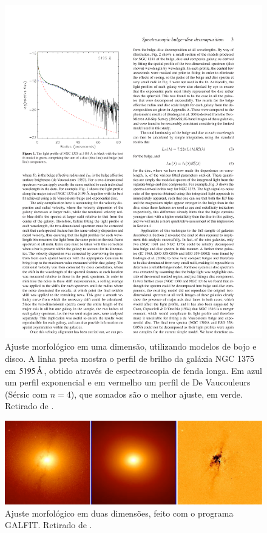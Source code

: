 \begin{figure}
	\includegraphics{figuras/johnston-decomp}
	\caption[Ajuste morfológico em uma dimensão] {Ajuste morfológico
	em uma dimensão, utilizando modelos de bojo e disco. A linha preta mostra o
	perfil de brilho da galáxia NGC 1375 em $5195\,\text{\normalfont\AA}$, obtido através de
	espectroscopia de fenda longa. Em azul um perfil exponencial e em vermelho um
	perfil de De Vaucouleurs (Sérsic com $n=4$), que somados são o melhor ajuste,
	em verde. Retirado de \citet{Johnston2012}.}
	\label{fig:decompJohnston}
\end{figure}

\begin{figure}
	\includegraphics[width=1.0\textwidth]{figuras/galfit-decomp}
	\caption[Ajuste morfológico em duas dimensões] {Ajuste morfológico
	em duas dimensões, feito com o programa GALFIT. Retirado de \citep{Peng2002}.}
	\label{fig:decompGalfit}
\end{figure}

